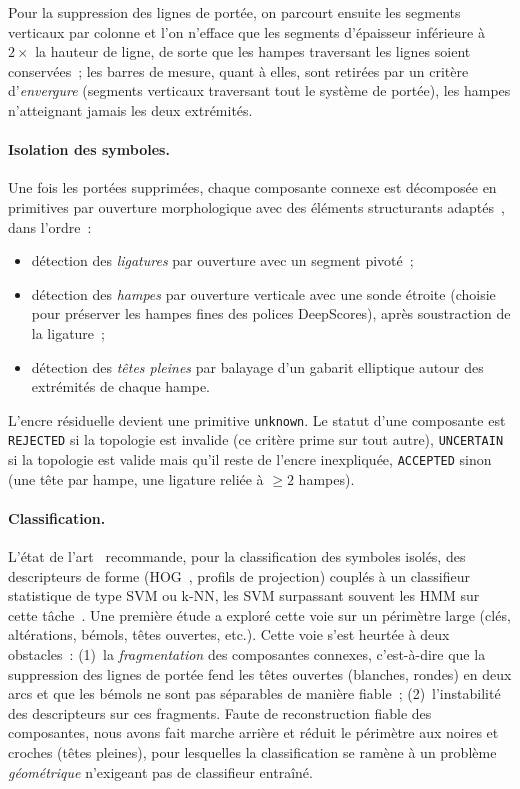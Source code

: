 \documentclass[a4paper,10pt]{article}
\begin{document}
Pour la suppression des lignes de portée, on parcourt ensuite les segments verticaux par colonne et l'on n'efface que les segments d'épaisseur inférieure à $2\times$ la hauteur de ligne, de sorte que les hampes traversant les lignes soient conservées~; les barres de mesure, quant à elles, sont retirées par un critère d'\emph{envergure} (segments verticaux traversant tout le système de portée), les hampes n'atteignant jamais les deux extrémités.

\paragraph{Isolation des symboles.}
Une fois les portées supprimées, chaque composante connexe est décomposée en primitives par ouverture morphologique avec des éléments structurants adaptés~\cite{NG199639}, dans l'ordre~:
\begin{itemize}
    \item détection des \emph{ligatures} par ouverture avec un segment pivoté~;
    \item détection des \emph{hampes} par ouverture verticale avec une sonde étroite (choisie pour préserver les hampes fines des polices DeepScores), après soustraction de la ligature~;
    \item détection des \emph{têtes pleines} par balayage d'un gabarit elliptique autour des extrémités de chaque hampe.
\end{itemize}
L'encre résiduelle devient une primitive \texttt{unknown}. Le statut d'une composante est \texttt{REJECTED} si la topologie est invalide (ce critère prime sur tout autre), \texttt{UNCERTAIN} si la topologie est valide mais qu'il reste de l'encre inexpliquée, \texttt{ACCEPTED} sinon (une tête par hampe, une ligature reliée à $\geq2$ hampes).

\paragraph{Classification.}\label{sec:classif}
L'état de l'art~\cite{rebelo2010,Rebelo2012-jn} recommande, pour la classification des symboles isolés, des descripteurs de forme (HOG~\cite{dalal2005hog}, profils de projection) couplés à un classifieur statistique de type SVM ou k-NN, les SVM surpassant souvent les HMM sur cette tâche~\cite{rebelo2010}. Une première étude a exploré cette voie sur un périmètre large (clés, altérations, bémols, têtes ouvertes, etc.). Cette voie s'est heurtée à deux obstacles~: (1)~la \emph{fragmentation} des composantes connexes, c'est-à-dire que la suppression des lignes de portée fend les têtes ouvertes (blanches, rondes) en deux arcs et que les bémols ne sont pas séparables de manière fiable~; (2)~l'instabilité des descripteurs sur ces fragments. Faute de reconstruction fiable des composantes, nous avons fait marche arrière et réduit le périmètre aux noires et croches (têtes pleines), pour lesquelles la classification se ramène à un problème \emph{géométrique} n'exigeant pas de classifieur entraîné.
\end{document}
